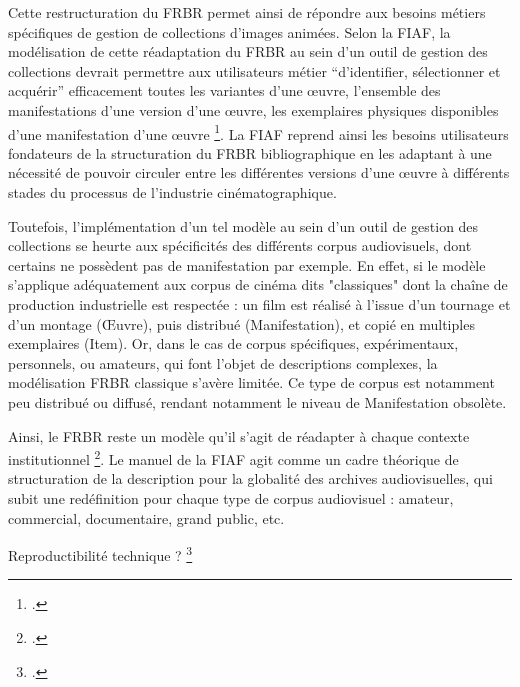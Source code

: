 		Cette restructuration du FRBR permet ainsi de répondre aux besoins métiers spécifiques de gestion de collections d’images animées. Selon la FIAF, la modélisation de cette réadaptation du FRBR au sein d’un outil de gestion des collections devrait permettre aux utilisateurs métier “d’identifier, sélectionner et acquérir” efficacement toutes les variantes d’une œuvre, l’ensemble des manifestations d’une version d’une œuvre, les exemplaires physiques disponibles d’une manifestation d’une œuvre \footcite{zotero-item-646}. La FIAF reprend ainsi les besoins utilisateurs fondateurs de la structuration du FRBR bibliographique en les adaptant à une nécessité de pouvoir circuler entre les différentes versions d’une œuvre à différents stades du processus de l’industrie cinématographique.  
		
		Toutefois, l’implémentation d’un tel modèle au sein d’un outil de gestion des collections se heurte aux spécificités des différents corpus audiovisuels, dont certains ne possèdent pas de manifestation par exemple. En effet, si le modèle s'applique adéquatement aux corpus de cinéma dits "classiques" dont la chaîne de production industrielle est respectée : un film est réalisé à l'issue d'un tournage et d'un montage (Œuvre), puis distribué (Manifestation), et copié en multiples exemplaires (Item). Or, dans le cas de corpus spécifiques, expérimentaux, personnels, ou amateurs, qui font l’objet de descriptions complexes, la modélisation FRBR classique s'avère limitée. Ce type de corpus est notamment peu distribué ou diffusé, rendant notamment le niveau de Manifestation obsolète. 
		
		Ainsi, le FRBR reste un modèle qu’il s’agit de réadapter à chaque contexte institutionnel \footcite{boeuf2008}. Le manuel de la FIAF agit comme un cadre théorique de structuration de la description pour la globalité des archives audiovisuelles, qui subit une redéfinition pour chaque type de corpus audiovisuel : amateur, commercial, documentaire, grand public, etc.  
		
		Reproductibilité technique ? \footcite{zotero-item-669} 
		
		
		
		
